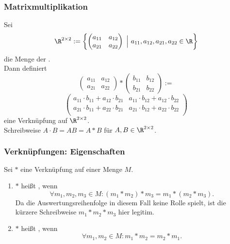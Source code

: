 %
%
\begin{frame}\frametitle{Matrixmultiplikation}
	
	Sei 
	$$
		\R^{2\times 2} 
		:=
		\left\{
			\begin{pmatrix}
				a_{11}	&	a_{12}	\\
				a_{21}	&	a_{22}
			\end{pmatrix}
			~ \Big| ~
			a_{11}, a_{12}, a_{21}, a_{22} \in \R
		\right\}
	$$
	die Menge der .\\
	
	\pause
	\vspace{2mm}
	Dann definiert
	$$
		\begin{pmatrix}
			a_{11}	&	a_{12}	\\
			a_{21}	&	a_{22}
		\end{pmatrix}
		\ast
		\begin{pmatrix}
			b_{11}	&	b_{12}	\\
			b_{21}	&	b_{22}
		\end{pmatrix}
		:=
	$$
	$$
		\begin{pmatrix}
			a_{11}\cdot b_{11} + a_{12}\cdot b_{21}	&	a_{11}\cdot b_{12} + a_{12}\cdot b_{22}	\\
			a_{21}\cdot b_{11} + a_{22}\cdot b_{21}	&	a_{21}\cdot b_{12} + a_{22}\cdot b_{22}	\\
		\end{pmatrix}
	$$
	eine Verknüpfung auf $\R^{2\times 2}$. \\[1mm]
	Schreibweise $A\cdot B = AB = A\ast B$ für $A,B \in \R^{2\times 2}$.
	
\end{frame}
%
%
\begin{frame}\frametitle{Verknüpfungen: Eigenschaften}

	Sei $\ast$ eine Verknüpfung auf einer Menge $M$.
	\begin{enumerate}
		\item $\ast$ hei{\ss}t , wenn
			$$
				\forall m_1, m_2, m_3 \in M: (m_1\ast m_2) \ast m_3 = m_1 \ast(m_2\ast m_3).
			$$
			Da die Auswertungsreihenfolge in diesem Fall keine Rolle spielt,  ist die kürzere Schreibweise $m_1\ast m_2 \ast m_3$ hier legitim.
		\pause
		\item $\ast$ hei{\ss}t , wenn 
			$$
				\forall m_1, m_2 \in M: m_1 \ast m_2 = m_2 \ast m_1.
			$$
	\end{enumerate}

\end{frame}
